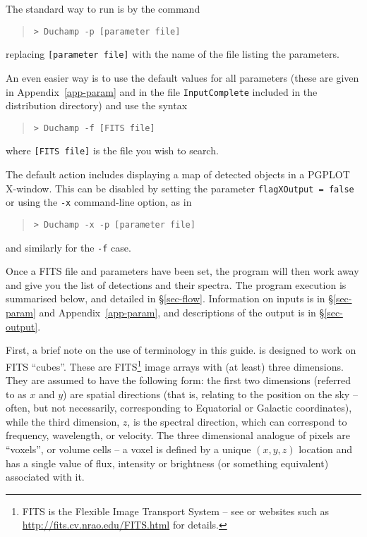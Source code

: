 The standard way to run \duchamp is by the command
\begin{quote}
{\footnotesize
\texttt{> Duchamp -p [parameter file]}
}
\end{quote}
replacing \texttt{[parameter file]} with the name of the file listing
the parameters. 

An even easier way is to use the default values for all parameters
(these are given in Appendix~\ref{app-param} and in the file
\texttt{InputComplete} included in the distribution directory) and use
the syntax
\begin{quote}
{\footnotesize
\texttt{> Duchamp -f [FITS file]}
}
\end{quote}
where \texttt{[FITS file]} is the file you wish to search. 

The default action includes displaying a map of detected objects in a
PGPLOT X-window. This can be disabled by setting the parameter
\texttt{flagXOutput = false} or using the \texttt{-x} command-line
option, as in
\begin{quote}
{\footnotesize
\texttt{> Duchamp -x -p [parameter file]}
}
\end{quote}
and similarly for the \texttt{-f} case.

Once a FITS file and parameters have been set, the program will then
work away and give you the list of detections and their spectra. The
program execution is summarised below, and detailed in
\S\ref{sec-flow}. Information on inputs is in \S\ref{sec-param} and
Appendix~\ref{app-param}, and descriptions of the output is in
\S\ref{sec-output}.


First, a brief note on the use of terminology in this guide. \duchamp
is designed to work on FITS ``cubes''. These are FITS\footnote{FITS is
the Flexible Image Transport System -- see \citet{hanisch01} or
websites such as
\href{http://fits.cv.nrao.edu/FITS.html}{http://fits.cv.nrao.edu/FITS.html}
for details.} image arrays with (at least) three dimensions. They
are assumed to have the following form: the first two dimensions
(referred to as $x$ and $y$) are spatial directions (that is, relating
to the position on the sky -- often, but not necessarily,
corresponding to Equatorial or Galactic coordinates), while the third
dimension, $z$, is the spectral direction, which can correspond to
frequency, wavelength, or velocity. The three dimensional analogue of
pixels are ``voxels'', or volume cells -- a voxel is defined by a
unique $(x,y,z)$ location and has a single value of flux, intensity
or brightness (or something equivalent) associated with it.

